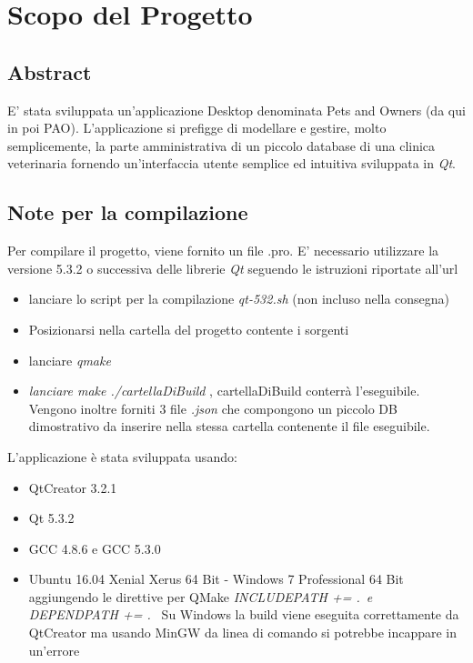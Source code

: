 \chapter{Scopo del Progetto} 
 
\section{Abstract}

E' stata sviluppata un'applicazione Desktop denominata Pets and Owners (da qui in poi PAO). 
L'applicazione si prefigge di modellare e gestire, molto semplicemente, la parte amministrativa di un piccolo database di una clinica veterinaria fornendo un'interfaccia utente semplice ed intuitiva sviluppata in \textit{Qt}.

\section{Note per la compilazione}
Per compilare il progetto, viene fornito un file .pro. E' necessario utilizzare la versione 5.3.2 o successiva delle librerie \textit{Qt} seguendo le istruzioni riportate all'url  
\begin{itemize}
	\item lanciare lo script per la compilazione \textit{qt-532.sh} (non incluso nella consegna)
	\item Posizionarsi nella cartella del progetto contente i sorgenti
	\item lanciare \textit{qmake} 
	\item \textit{lanciare make ./cartellaDiBuild} , cartellaDiBuild conterrà l'eseguibile. Vengono inoltre forniti 3 file \textit{.json} che compongono un piccolo DB dimostrativo da inserire nella stessa cartella contenente il file eseguibile. 
\end{itemize}

L'applicazione è stata sviluppata usando:
\begin{itemize}
	\item QtCreator 3.2.1
	\item Qt 5.3.2
	\item GCC 4.8.6 e GCC 5.3.0
	\item Ubuntu 16.04 Xenial Xerus 64 Bit - Windows 7 Professional 64 Bit aggiungendo le direttive per QMake \textit{ INCLUDEPATH += .\ e  DEPENDPATH += .\ } Su Windows la build viene eseguita correttamente da QtCreator ma usando MinGW da linea di comando si potrebbe incappare in un'errore 

\end{itemize}

